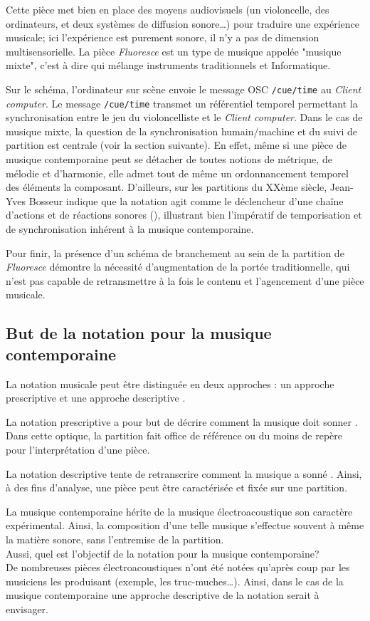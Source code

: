 Cette pièce met bien en place des moyens audiovisuels (un violoncelle, des ordinateurs, et deux systèmes de diffusion sonore…) pour traduire une expérience musicale; ici l'expérience est purement sonore, il n'y a pas de dimension multisensorielle. La pièce \textit{Fluoresce} est un type de musique appelée "musique mixte", c'est à dire qui mélange instruments traditionnels et Informatique.

Sur le schéma, l'ordinateur sur scène envoie le message OSC \texttt{/cue/time} au \textit{Client computer}. Le message \texttt{/cue/time} transmet un référentiel temporel permettant la synchronisation entre le jeu du violoncelliste et le \textit{Client computer}. 
Dans le cas de musique mixte, la question de la synchronisation humain/machine et du suivi de partition est centrale (voir la section suivante). 
En effet, même si une pièce de musique contemporaine peut se détacher de toutes notions de métrique, de mélodie et d'harmonie, elle admet tout de même un ordonnancement temporel des éléments la composant.
D'ailleurs, sur les partitions du XXème siècle, Jean-Yves Bosseur indique que la notation agit comme le \og déclencheur d'une chaîne d'actions et de réactions sonores \fg (\cite[121]{bosseur2005}), illustrant bien l'impératif de temporisation et de synchronisation inhérent à la musique contemporaine.

Pour finir, la présence d'un schéma de branchement au sein de la partition de \textit{Fluoresce} démontre la nécessité d'augmentation de la portée traditionnelle, qui n'est pas capable de retransmettre à la fois le contenu et l'agencement d'une pièce musicale.

\subsection{But de la notation pour la musique contemporaine}
\label{subsec:butDeLaNotation}
La notation musicale peut être distinguée en deux approches : un approche prescriptive et une approche descriptive \cite{battier2015}.

La notation prescriptive a pour but de décrire \og comment la musique doit sonner \fg.
Dans cette optique, la partition fait office de référence ou du moins de repère pour l'interprétation d'une pièce. 

La notation descriptive tente de retranscrire \og comment la musique a sonné \fg.
Ainsi, à des fins d'analyse, une pièce peut être caractérisée et fixée sur une partition.

La musique contemporaine hérite de la musique électroacoustique son caractère expérimental. Ainsi, la composition d'une telle musique s'effectue souvent à même la matière sonore, sans l'entremise de la partition.\\
Aussi, quel est l'objectif de la notation pour la musique contemporaine?\\
De nombreuses pièces électroacoustiques n'ont été notées qu'après coup par les musiciens les produisant (exemple, les truc-muches…). Ainsi, dans le cas de la musique contemporaine une approche descriptive de la notation serait à envisager.

